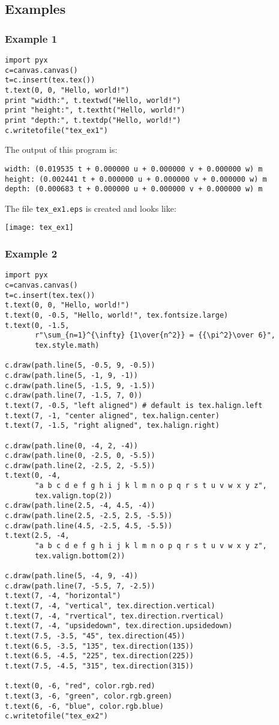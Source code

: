 \subsection{Examples}
\subsubsection{Example 1}
\begin{verbatim}
import pyx
c=canvas.canvas()
t=c.insert(tex.tex())
t.text(0, 0, "Hello, world!")
print "width:", t.textwd("Hello, world!")
print "height:", t.textht("Hello, world!")
print "depth:", t.textdp("Hello, world!")
c.writetofile("tex_ex1")
\end{verbatim}

The output of this program is:
\begin{verbatim}
width: (0.019535 t + 0.000000 u + 0.000000 v + 0.000000 w) m
height: (0.002441 t + 0.000000 u + 0.000000 v + 0.000000 w) m
depth: (0.000683 t + 0.000000 u + 0.000000 v + 0.000000 w) m
\end{verbatim}

The file \verb|tex_ex1.eps| is created and looks like:

\bigskip
\texttt{[image: tex\_ex1]}

\subsubsection{Example 2}
\begin{verbatim}
import pyx
c=canvas.canvas()
t=c.insert(tex.tex())
t.text(0, 0, "Hello, world!")
t.text(0, -0.5, "Hello, world!", tex.fontsize.large)
t.text(0, -1.5,
       r"\sum_{n=1}^{\infty} {1\over{n^2}} = {{\pi^2}\over 6}",
       tex.style.math)

c.draw(path.line(5, -0.5, 9, -0.5))
c.draw(path.line(5, -1, 9, -1))
c.draw(path.line(5, -1.5, 9, -1.5))
c.draw(path.line(7, -1.5, 7, 0))
t.text(7, -0.5, "left aligned") # default is tex.halign.left
t.text(7, -1, "center aligned", tex.halign.center)
t.text(7, -1.5, "right aligned", tex.halign.right)

c.draw(path.line(0, -4, 2, -4))
c.draw(path.line(0, -2.5, 0, -5.5))
c.draw(path.line(2, -2.5, 2, -5.5))
t.text(0, -4,
       "a b c d e f g h i j k l m n o p q r s t u v w x y z",
       tex.valign.top(2))
c.draw(path.line(2.5, -4, 4.5, -4))
c.draw(path.line(2.5, -2.5, 2.5, -5.5))
c.draw(path.line(4.5, -2.5, 4.5, -5.5))
t.text(2.5, -4,
       "a b c d e f g h i j k l m n o p q r s t u v w x y z",
       tex.valign.bottom(2))

c.draw(path.line(5, -4, 9, -4))
c.draw(path.line(7, -5.5, 7, -2.5))
t.text(7, -4, "horizontal")
t.text(7, -4, "vertical", tex.direction.vertical)
t.text(7, -4, "rvertical", tex.direction.rvertical)
t.text(7, -4, "upsidedown", tex.direction.upsidedown)
t.text(7.5, -3.5, "45", tex.direction(45))
t.text(6.5, -3.5, "135", tex.direction(135))
t.text(6.5, -4.5, "225", tex.direction(225))
t.text(7.5, -4.5, "315", tex.direction(315))

t.text(0, -6, "red", color.rgb.red)
t.text(3, -6, "green", color.rgb.green)
t.text(6, -6, "blue", color.rgb.blue)
c.writetofile("tex_ex2")
\end{verbatim}

